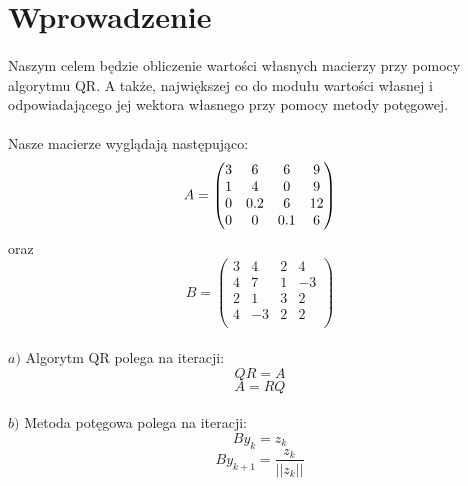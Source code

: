 \documentclass{article}
\begin{document}
\section{Wprowadzenie}

\paragraph{}
Naszym celem będzie obliczenie wartości własnych macierzy przy pomocy algorytmu QR. A także,
największej co do modułu wartości własnej i odpowiadającego jej wektora własnego przy pomocy
metody potęgowej.

\paragraph{}
Nasze macierze wyglądają następująco: \\
\begin{equation*}
 \medskip
 A = \begin{pmatrix}
    3 &6& 6 &9\\
1 &4 &0& 9\\
0& 0.2& 6 &12\\
0& 0 &0.1 &6\\
    \end{pmatrix}
\end{equation*}
oraz
\begin{equation*}
B = \begin{pmatrix}
    3 &4& 2& 4\\
    4& 7& 1 &-3\\
    2& 1& 3 &2\\
    4& -3& 2& 2\\
    \end{pmatrix}
\end{equation*}
\paragraph{}
$a)$ Algorytm QR polega na iteracji: \\
\begin{equation*}
    QR = A 
\end{equation*}
\begin{equation*}
    A = RQ
\end{equation*}
\paragraph{}
$b)$ Metoda potęgowa polega na iteracji: \\
\begin{equation*}
    By_{k} = z_{k}
\end{equation*}
\begin{equation*}
    By_{k+1} = \frac{z_{k}}{||z_{k}||}
\end{equation*}
\medskip
\end{document}
